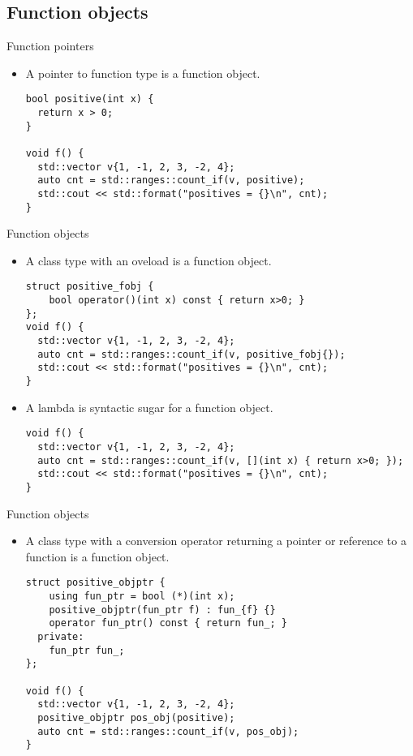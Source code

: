\subsection{Function objects}

\begin{frame}[t,fragile]{Function pointers}
\begin{itemize}
   \item A pointer to function type is a function object.
\begin{lstlisting}
bool positive(int x) { 
  return x > 0; 
}

void f() {
  std::vector v{1, -1, 2, 3, -2, 4};
  auto cnt = std::ranges::count_if(v, positive);
  std::cout << std::format("positives = {}\n", cnt);
}
\end{lstlisting}
\end{itemize}
\end{frame}

\begin{frame}[t,fragile]{Function objects}
\begin{itemize}
  \item A class type with an  oveload is a function object.
\begin{lstlisting}
struct positive_fobj {
    bool operator()(int x) const { return x>0; }
};
void f() {
  std::vector v{1, -1, 2, 3, -2, 4};
  auto cnt = std::ranges::count_if(v, positive_fobj{});
  std::cout << std::format("positives = {}\n", cnt);
}
\end{lstlisting}

  \item A lambda is syntactic sugar for a function object.
\begin{lstlisting}
void f() {
  std::vector v{1, -1, 2, 3, -2, 4};
  auto cnt = std::ranges::count_if(v, [](int x) { return x>0; });
  std::cout << std::format("positives = {}\n", cnt);
}
\end{lstlisting}

\end{itemize}
\end{frame}

\begin{frame}[t,fragile]{Function objects}
\begin{itemize}
  \item A class type with a conversion operator returning a pointer or reference
        to a function is a function object.
\begin{lstlisting}
struct positive_objptr {
    using fun_ptr = bool (*)(int x);
    positive_objptr(fun_ptr f) : fun_{f} {}
    operator fun_ptr() const { return fun_; }
  private:
    fun_ptr fun_;
};

void f() {
  std::vector v{1, -1, 2, 3, -2, 4};
  positive_objptr pos_obj(positive);
  auto cnt = std::ranges::count_if(v, pos_obj);
}
\end{lstlisting}

\end{itemize}
\end{frame}
